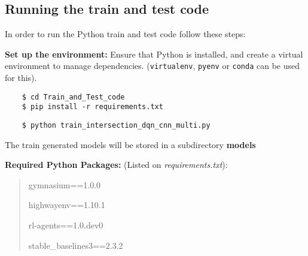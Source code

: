 \subsection*{Running the train and test code}

In order to run the Python train and test code follow these steps:

\textbf{Set up the environment:} Ensure that Python is installed, and create a virtual environment to manage dependencies.
(\texttt{virtualenv}, \texttt{pyenv} or \texttt{conda} can be used for this).

\begin{verbatim}
    $ cd Train_and_Test_code
    $ pip install -r requirements.txt
\end{verbatim}


\begin{verbatim}
    $ python train_intersection_dqn_cnn_multi.py
\end{verbatim}

The train generated models will be stored in a subdirectory \textbf{models}

\textbf{Required Python Packages:} (Listed on \textit{requirements.txt}):
\begin{quote}

    gymnasium==1.0.0

    highway\-env==1.10.1

    rl-agents==1.0.dev0

    stable\_baselines3==2.3.2

\end{quote}


